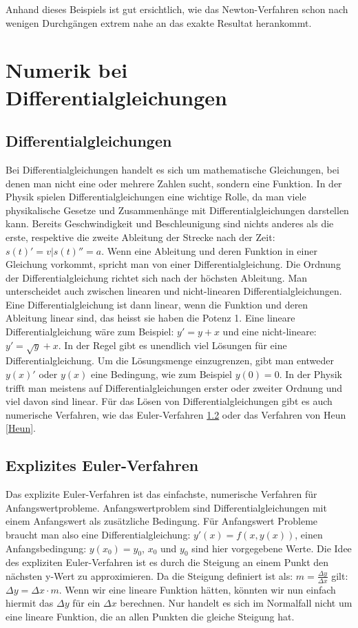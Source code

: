 \documentclass[a4paper,12pt]{report}
\begin{document}
\noindent
Anhand dieses Beispiels ist gut ersichtlich, wie das Newton-Verfahren schon nach wenigen Durchgängen extrem nahe an das exakte Resultat herankommt. 

\chapter{Numerik bei Differentialgleichungen}
\section{Differentialgleichungen}
Bei Differentialgleichungen handelt es sich um mathematische Gleichungen, bei denen man nicht eine oder mehrere Zahlen sucht, sondern eine Funktion. In der Physik spielen Differentialgleichungen eine wichtige Rolle, da man viele physikalische Gesetze und Zusammenhänge mit Differentialgleichungen darstellen kann. Bereits Geschwindigkeit und Beschleunigung sind nichts anderes als die erste, respektive die zweite Ableitung der Strecke nach der Zeit: $s(t)' = v \vert s(t)'' = a$. Wenn eine Ableitung und deren Funktion in einer Gleichung vorkommt, spricht man von einer Differentialgleichung. Die Ordnung der Differentialgleichung richtet sich nach der höchsten Ableitung. Man unterscheidet auch zwischen linearen und nicht-linearen Differentialgleichungen. Eine Differentialgleichung ist dann linear, wenn die Funktion und deren Ableitung linear sind, das heisst sie haben die Potenz 1. Eine lineare Differentialgleichung wäre zum Beispiel: $y' = y + x$ und eine nicht-lineare: $y' = \sqrt{y}+ x$. In der Regel gibt es unendlich viel Lösungen für eine Differentialgleichung. Um die Lösungsmenge einzugrenzen, gibt man entweder $y(x)'$ oder $y(x)$ eine Bedingung, wie zum Beispiel $y(0) = 0$. In der Physik trifft man meistens auf Differentialgleichungen erster oder zweiter Ordnung und viel davon sind linear. Für das Lösen von Differentialgleichungen gibt es auch numerische Verfahren, wie das Euler-Verfahren \ref{Euler} oder das Verfahren von Heun \ref{Heun}. \cite[Spektrum.de]{Differentialgleichung}

\section{Explizites Euler-Verfahren}\label{Euler}
Das explizite Euler-Verfahren ist das einfachste, numerische Verfahren für Anfangswertprobleme. Anfangswertproblem sind Differentialgleichungen mit einem Anfangswert als zusätzliche Bedingung. Für Anfangswert Probleme braucht man also eine Differentialgleichung: $y'(x) = f(x, y(x))$, einen Anfangsbedingung: $y(x_0) = y_0$, $x_0$ und $y_0$ sind hier vorgegebene Werte. Die Idee des expliziten Euler-Verfahren ist es durch die Steigung an einem Punkt den nächsten y-Wert zu approximieren. Da die Steigung definiert ist als: $m = \frac{\Delta y}{\Delta x}$ gilt: $\Delta y = \Delta x \cdot m$. Wenn wir eine lineare Funktion hätten, könnten wir nun einfach hiermit das $\Delta y$ für ein $\Delta x$ berechnen. Nur handelt es sich im Normalfall nicht um eine lineare Funktion, die an allen Punkten die gleiche Steigung hat.\\
\end{document}
